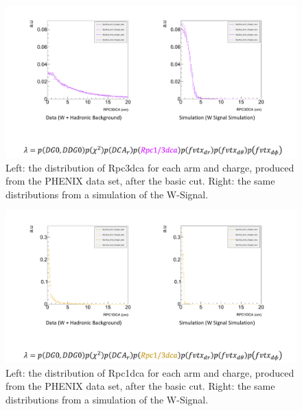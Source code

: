\begin{figure}
  \centering
  \includegraphics[width=\linewidth,trim=4 4 4 4,clip]{./figures/pdf_rpc3dca.png}
  \caption{
    Left: the distribution of Rpc3dca for each arm and charge, produced from the
    PHENIX data set, after the basic cut. Right: the same distributions from a
    simulation of the W-Signal.
  }
  \label{fig:pdf_rpc3dca}
\end{figure}

\begin{figure}
  \centering
  \includegraphics[width=\linewidth,trim=4 4 4 4,clip]{./figures/pdf_rpc1dca.png}
  \caption{
    Left: the distribution of Rpc1dca for each arm and charge, produced from the
    PHENIX data set, after the basic cut. Right: the same distributions from a
    simulation of the W-Signal.
  }
  \label{fig:pdf_rpc1dca}
\end{figure}

